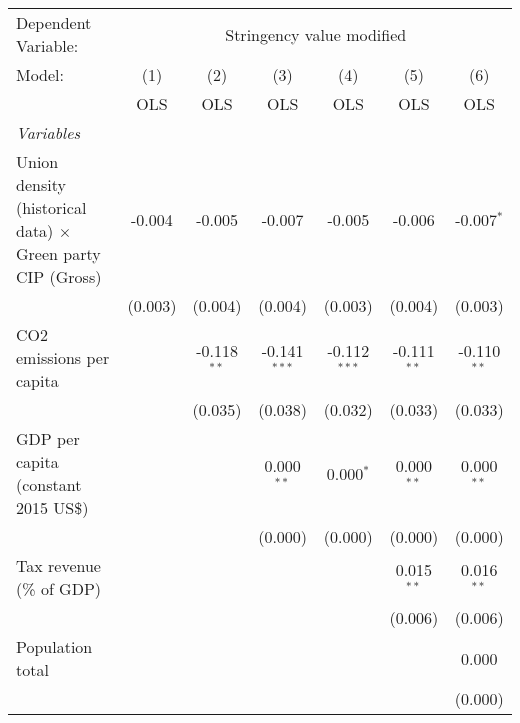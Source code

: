 
\begingroup
\centering
\begin{tabular}{lcccccc}
   \toprule
   Dependent Variable: & \multicolumn{6}{c}{Stringency value modified}\\
   Model:                                                            & (1)     & (2)           & (3)            & (4)            & (5)           & (6)\\  
                                                                     &  OLS    & OLS           & OLS            & OLS            & OLS           & OLS\\  
   \midrule
   \emph{Variables}\\
   Union density (historical data) $\times$ Green party CIP (Gross)  & -0.004  & -0.005        & -0.007         & -0.005         & -0.006        & -0.007$^{*}$\\   
                                                                     & (0.003) & (0.004)       & (0.004)        & (0.003)        & (0.004)       & (0.003)\\   
   CO2 emissions per capita                                          &         & -0.118$^{**}$ & -0.141$^{***}$ & -0.112$^{***}$ & -0.111$^{**}$ & -0.110$^{**}$\\   
                                                                     &         & (0.035)       & (0.038)        & (0.032)        & (0.033)       & (0.033)\\   
   GDP per capita (constant 2015 US\$)                               &         &               & 0.000$^{**}$   & 0.000$^{*}$    & 0.000$^{**}$  & 0.000$^{**}$\\   
                                                                     &         &               & (0.000)        & (0.000)        & (0.000)       & (0.000)\\   
   Tax revenue (\% of GDP)                                           &         &               &                &                & 0.015$^{**}$  & 0.016$^{**}$\\   
                                                                     &         &               &                &                & (0.006)       & (0.006)\\   
   Population total                                                  &         &               &                &                &               & 0.000\\   
                                                                     &         &               &                &                &               & (0.000)\\   

\end{tabular}

